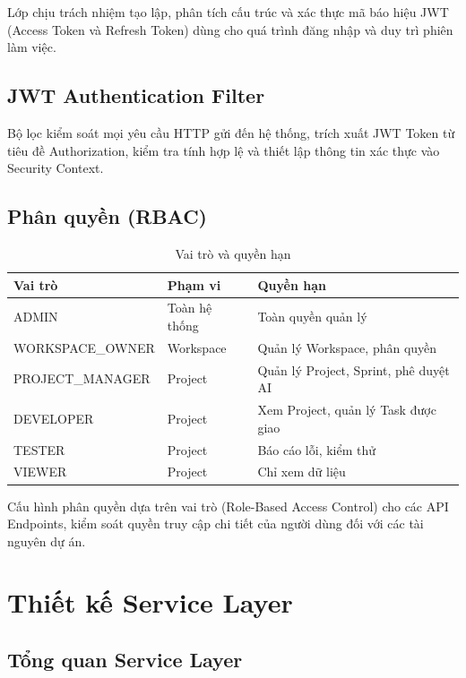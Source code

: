 \documentclass[12pt,a4paper]{report}
\begin{document}
Lớp chịu trách nhiệm tạo lập, phân tích cấu trúc và xác thực mã báo hiệu JWT (Access Token và Refresh Token) dùng cho quá trình đăng nhập và duy trì phiên làm việc.

\subsection{JWT Authentication Filter}

Bộ lọc kiểm soát mọi yêu cầu HTTP gửi đến hệ thống, trích xuất JWT Token từ tiêu đề Authorization, kiểm tra tính hợp lệ và thiết lập thông tin xác thực vào Security Context.

\subsection{Phân quyền (RBAC)}

\begin{table}[H]
\centering
\caption{Vai trò và quyền hạn}
\begin{tabular}{|p{3.5cm}|p{4.5cm}|p{7cm}|}
\hline
\textbf{Vai trò} & \textbf{Phạm vi} & \textbf{Quyền hạn} \\
\hline
ADMIN & Toàn hệ thống & Toàn quyền quản lý \\
\hline
WORKSPACE\_OWNER & Workspace & Quản lý Workspace, phân quyền \\
\hline
PROJECT\_MANAGER & Project & Quản lý Project, Sprint, phê duyệt AI \\
\hline
DEVELOPER & Project & Xem Project, quản lý Task được giao \\
\hline
TESTER & Project & Báo cáo lỗi, kiểm thử \\
\hline
VIEWER & Project & Chỉ xem dữ liệu \\
\hline
\end{tabular}
\label{tab:roles_permissions}
\end{table}

Cấu hình phân quyền dựa trên vai trò (Role-Based Access Control) cho các API Endpoints, kiểm soát quyền truy cập chi tiết của người dùng đối với các tài nguyên dự án.

\section{Thiết kế Service Layer}

\subsection{Tổng quan Service Layer}
\end{document}
